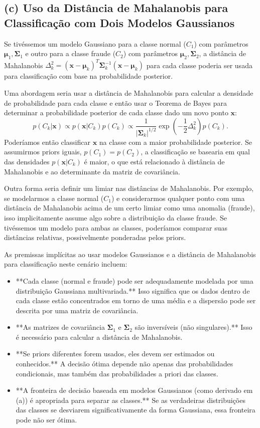 \documentclass{article}
\begin{document}
\subsection*{(c) Uso da Distância de Mahalanobis para Classificação com Dois Modelos Gaussianos}

Se tivéssemos um modelo Gaussiano para a classe normal ($C_1$) com parâmetros $\boldsymbol{\mu}_1, \boldsymbol{\Sigma}_1$ e outro para a classe fraude ($C_2$) com parâmetros $\boldsymbol{\mu}_2, \boldsymbol{\Sigma}_2$, a distância de Mahalanobis $\Delta_k^2 = (\mathbf{x} - \boldsymbol{\mu}_k)^T \boldsymbol{\Sigma}_k^{-1} (\mathbf{x} - \boldsymbol{\mu}_k)$ para cada classe poderia ser usada para classificação com base na probabilidade posterior.

Uma abordagem seria usar a distância de Mahalanobis para calcular a densidade de probabilidade para cada classe e então usar o Teorema de Bayes para determinar a probabilidade posterior de cada classe dado um novo ponto $\mathbf{x}$:
\[
p(C_k | \mathbf{x}) \propto p(\mathbf{x} | C_k) p(C_k) \propto \frac{1}{|\boldsymbol{\Sigma}_k|^{1/2}} \exp\left(-\frac{1}{2} \Delta_k^2\right) p(C_k).
\]
Poderíamos então classificar $\mathbf{x}$ na classe com a maior probabilidade posterior. Se assumirmos priors iguais, $p(C_1) = p(C_2)$, a classificação se basearia em qual das densidades $p(\mathbf{x} | C_k)$ é maior, o que está relacionado à distância de Mahalanobis e ao determinante da matriz de covariância.

Outra forma seria definir um limiar nas distâncias de Mahalanobis. Por exemplo, se modelarmos a classe normal ($C_1$) e considerarmos qualquer ponto com uma distância de Mahalanobis acima de um certo limiar como uma anomalia (fraude), isso implicitamente assume algo sobre a distribuição da classe fraude. Se tivéssemos um modelo para ambas as classes, poderíamos comparar suas distâncias relativas, possivelmente ponderadas pelos priors.

As premissas implícitas ao usar modelos Gaussianos e a distância de Mahalanobis para classificação neste cenário incluem:
\begin{itemize}
    \item **Cada classe (normal e fraude) pode ser adequadamente modelada por uma distribuição Gaussiana multivariada.** Isso significa que os dados dentro de cada classe estão concentrados em torno de uma média e a dispersão pode ser descrita por uma matriz de covariância.
    \item **As matrizes de covariância $\boldsymbol{\Sigma}_1$ e $\boldsymbol{\Sigma}_2$ são inversíveis (não singulares).** Isso é necessário para calcular a distância de Mahalanobis.
    \item **Se priors diferentes forem usados, eles devem ser estimados ou conhecidos.** A decisão ótima depende não apenas das probabilidades condicionais, mas também das probabilidades a priori das classes.
    \item **A fronteira de decisão baseada em modelos Gaussianos (como derivado em (a)) é apropriada para separar as classes.** Se as verdadeiras distribuições das classes se desviarem significativamente da forma Gaussiana, essa fronteira pode não ser ótima.
\end{itemize}
\end{document}
